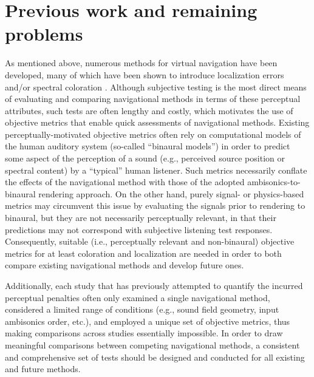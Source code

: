 \section{Previous work and remaining problems}
As mentioned above, numerous methods for virtual navigation have been developed, many of which have been shown to introduce localization errors \citep{Winter2014,TylkaChoueiri2015,TylkaChoueiri2016} and/or spectral coloration \citep{HahnSpors2015b,TylkaChoueiri2016}.
Although subjective testing is the most direct means of evaluating and comparing navigational methods in terms of these perceptual attributes, such tests are often lengthy and costly, which motivates the use of objective metrics that enable quick assessments of navigational methods.
Existing perceptually-motivated objective metrics often rely on computational models of the human auditory system (so-called ``binaural models'') in order to predict some aspect of the perception of a sound (e.g., perceived source position or spectral content) by a ``typical'' human listener.
Such metrics necessarily conflate the effects of the navigational method with those of the adopted ambisonics-to-binaural rendering approach.
On the other hand, purely signal- or physics-based metrics may circumvent this issue by evaluating the signals prior to rendering to binaural, but they are not necessarily perceptually relevant, in that their predictions may not correspond with subjective listening test responses.
Consequently, suitable (i.e., perceptually relevant and non-binaural) objective metrics for at least coloration and localization are needed in order to both compare existing navigational methods and develop future ones.

Additionally, each study that has previously attempted to quantify the incurred perceptual penalties often only examined a single navigational method, considered a limited range of conditions (e.g., sound field geometry, input ambisonics order, etc.), and employed a unique set of objective metrics, thus making comparisons across studies essentially impossible.
In order to draw meaningful comparisons between competing navigational methods, a consistent and comprehensive set of tests should be designed and conducted for all existing and future methods.

